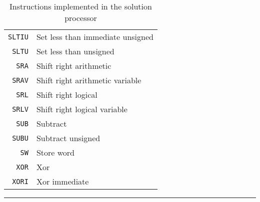 \begin{table}[h]
\begin{center}
\begin{tabular}{r|l}
            \texttt{SLTIU} & Set less than immediate unsigned \\
            \texttt{SLTU} & Set less than unsigned \\
            \texttt{SRA} & Shift right arithmetic \\
            \texttt{SRAV} & Shift right arithmetic variable \\
            \texttt{SRL} & Shift right logical \\
            \texttt{SRLV} & Shift right logical variable \\
            \texttt{SUB} & Subtract \\
            \texttt{SUBU} & Subtract unsigned \\
            \texttt{SW} & Store word \\
            \texttt{XOR} & Xor \\
            \texttt{XORI} & Xor immediate \\
        \end{tabular}
        \smallskip
        \hrule
        \smallskip
        \caption{Instructions implemented in the solution processor}
        \label{table:implemented-instructions}
    \end{center}
\end{table}

